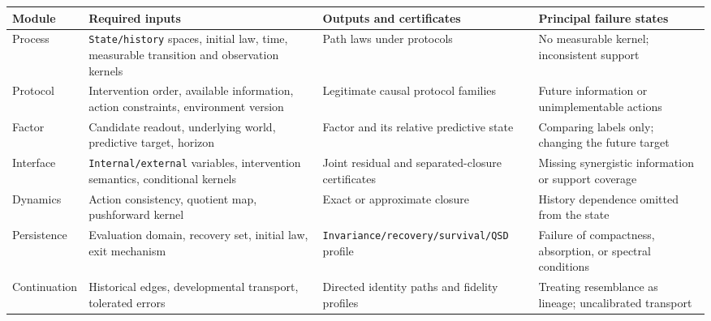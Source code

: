 \documentclass[
  english,
  11pt,
  oneside]{book}
\newcounter{none} %
\begin{document}
{\def\LTcaptype{none} %
\begin{longtable}[]{@{}
  >{\raggedright\arraybackslash}p{}
  >{\raggedright\arraybackslash}p{}
  >{\raggedright\arraybackslash}p{}
  >{\raggedright\arraybackslash}p{}@{}}
\toprule\noalign{}
\begin{minipage}[b]{\linewidth}\raggedright
Module
\end{minipage} & \begin{minipage}[b]{\linewidth}\raggedright
Required inputs
\end{minipage} & \begin{minipage}[b]{\linewidth}\raggedright
Outputs and certificates
\end{minipage} & \begin{minipage}[b]{\linewidth}\raggedright
Principal failure states
\end{minipage} \\
\midrule\noalign{}
\endhead
\bottomrule\noalign{}
\endlastfoot
Process & \nolinkurl{State/history} spaces, initial law, time, measurable transition and observation kernels & Path laws under protocols & No measurable kernel; inconsistent support \\
Protocol & Intervention order, available information, action constraints, environment version & Legitimate causal protocol families & Future information or unimplementable actions \\
Factor & Candidate readout, underlying world, predictive target, horizon & Factor and its relative predictive state & Comparing labels only; changing the future target \\
Interface & \nolinkurl{Internal/external} variables, intervention semantics, conditional kernels & Joint residual and separated-closure certificates & Missing synergistic information or support coverage \\
Dynamics & Action consistency, quotient map, pushforward kernel & Exact or approximate closure & History dependence omitted from the state \\
Persistence & Evaluation domain, recovery set, initial law, exit mechanism & \nolinkurl{Invariance/recovery/survival/QSD} profile & Failure of compactness, absorption, or spectral conditions \\
Continuation & Historical edges, developmental transport, tolerated errors & Directed identity paths and fidelity profiles & Treating resemblance as lineage; uncalibrated transport \\

\end{longtable}}
\end{document}
